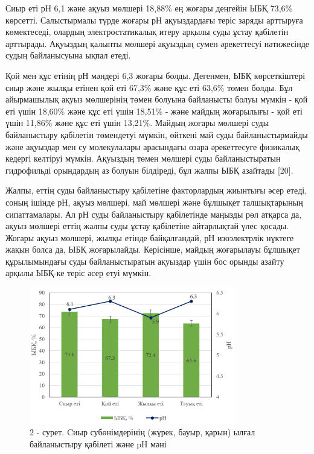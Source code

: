 \begin{multicols}{2}
Сиыр еті рН 6,1 және ақуыз мөлшері 18,88\% ең жоғары деңгейін ЫБҚ 73,6\%
көрсетті. Салыстырмалы түрде жоғары рН ақуыздардағы теріс заряды
арттыруға көмектеседі, олардың электростатикалық итеру арқылы суды ұстау
қабілетін арттырады. Ақуыздың қалыпты мөлшері ақуыздың сумен әрекеттесуі
нәтижесінде судың байланысуына ықпал етеді.

Қой мен құс етінің рН мәндері 6,3 жоғары болды. Дегенмен, ЫБҚ
көрсеткіштері сиыр және жылқы етінен қой еті 67,3\% және құс еті 63,6\%
төмен болды. Бұл айырмашылық ақуыз мөлшерінің төмен болуына байланысты
болуы мүмкін - қой еті үшін 18,60\% және құс еті үшін 18,51\% - және
майдың жоғарылығы - қой еті үшін 11,86\% және құс еті үшін 13,21\%.
Майдың жоғары мөлшері суды байланыстыру қабілетін төмендетуі мүмкін,
өйткені май суды байланыстырмайды және ақуыздар мен су молекулалары
арасындағы өзара әрекеттесуге физикалық кедергі келтіруі мүмкін.
Ақуыздың төмен мөлшері суды байланыстыратын гидрофильді орындардың аз
болуын білдіреді, бұл жалпы ЫБҚ азайтады {[}20{]}.

Жалпы, еттің суды байланыстыру қабілетіне факторлардың жиынтығы әсер
етеді, соның ішінде рН, ақуыз мөлшері, май мөлшері және бұлшықет
талшықтарының сипаттамалары. Ал рН суды байланыстыру қабілетінде маңызды
рөл атқарса да, ақуыз мөлшері еттің жалпы суды ұстау қабілетіне
айтарлықтай үлес қосады. Жоғары ақуыз мөлшері, жылқы етінде
байқалғандай, рН изоэлектрлік нүктеге жақын болса да, ЫБҚ жоғарылайды.
Керісінше, майдың жоғарылауы бұлшықет құрылымындағы суды байланыстыратын
ақуыздар үшін бос орынды азайту арқылы ЫБҚ-ке теріс әсер етуі мүмкін.
\end{multicols}


\begin{figure}[H]
	\centering
	\includegraphics[width=0.8\textwidth]{media/pish/image5}
	\caption*{2 - сурет. Cиыр субөнімдерінің (жүрек, бауыр, қарын) ылғал байланыстыру қабілеті және pH мәні}
\end{figure}

